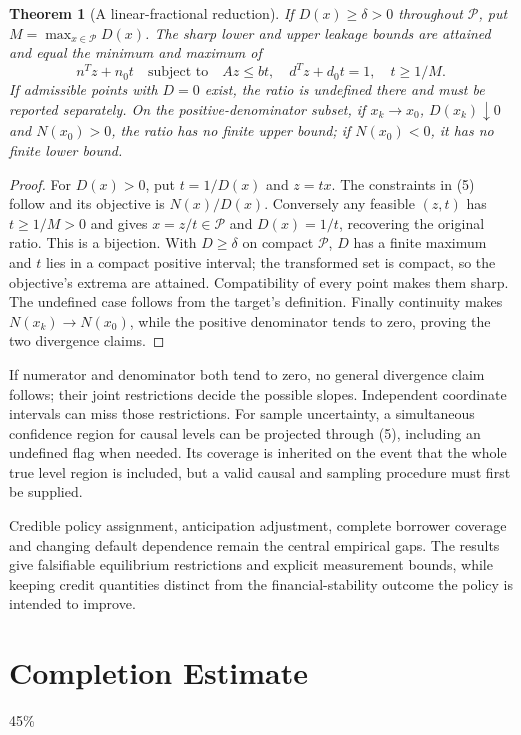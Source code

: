 \documentclass[11pt]{article}
\newtheorem{theorem}{Theorem}
\theoremstyle{remark}
\begin{document}
\begin{theorem}[A linear-fractional reduction]
If $D(x)\geq\delta>0$ throughout $\mathcal P$, put
$M=\max_{x\in\mathcal P}D(x)$. The sharp lower and
upper leakage bounds are attained and equal the minimum and maximum of
\[
 n^Tz+n_0t\quad\text{subject to}\quad
 Az\leq bt,\quad d^Tz+d_0t=1,\quad t\geq1/M.                           \tag{5}
\]
If admissible points with $D=0$ exist, the ratio is undefined there and
must be reported separately. On the positive-denominator subset,
if $x_k\to x_0$, $D(x_k)\downarrow0$ and $N(x_0)>0$, the ratio has
no finite upper bound; if $N(x_0)<0$, it has no finite lower bound.
\end{theorem}
\begin{proof}
For $D(x)>0$, put $t=1/D(x)$ and $z=tx$. The constraints in (5) follow
and its objective is $N(x)/D(x)$. Conversely any feasible $(z,t)$ has
$t\geq1/M>0$ and gives $x=z/t\in\mathcal P$ and $D(x)=1/t$, recovering the
original ratio. This is a bijection. With $D\geq\delta$ on compact
$\mathcal P$, $D$ has a finite maximum and $t$ lies in a compact
positive interval; the transformed set is compact, so the objective's
extrema are attained. Compatibility of every point makes them sharp.
The undefined case follows from the target's definition. Finally continuity
makes $N(x_k)\to N(x_0)$, while the positive denominator tends to zero,
proving the two divergence claims.
\end{proof}
If numerator and denominator both tend to zero, no general divergence
claim follows; their joint restrictions decide the possible slopes.
Independent coordinate intervals can miss those restrictions. For sample
uncertainty, a simultaneous confidence region for causal levels can be
projected through (5), including an undefined flag when needed. Its
coverage is inherited on the event that the whole true level region is
included, but a valid causal and sampling procedure must first be supplied.

Credible policy assignment, anticipation adjustment, complete borrower
coverage and changing default dependence remain the central empirical
gaps. The results give falsifiable equilibrium restrictions and explicit
measurement bounds, while keeping credit quantities distinct from the
financial-stability outcome the policy is intended to improve.

\section{Completion Estimate}
45\%
\end{document}

